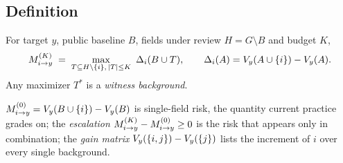 \begin{table}[!tbp]
\centering\small
\caption{Requirements for a field-level inference-risk quantity. \checkmark: satisfied;
$\circ$: partially; --: not satisfied.}\label{tab:req}
\end{table}

\subsection{Definition}
\begin{definition}\label{def:mk}
For target $y$, public baseline $B$, fields under review $H=G\setminus B$ and budget $K$,
\begin{equation}\label{eq:mk}
\Mik \;=\; \max_{T \subseteq H \setminus \{i\},\, |T| \le K}\ \Delta_i(B\cup T),\qquad
\Delta_i(A)=\Vy(A \cup \{i\}) - \Vy(A).
\end{equation}
Any maximizer $T^{*}$ is a \emph{witness background}.
\end{definition}
$M^{(0)}_{i\to y}=V_{y}(B\cup\{i\})-V_{y}(B)$ is single-field risk, the quantity current practice
grades on; the \emph{escalation} $M^{(K)}_{i \to y}-M^{(0)}_{i\to y}\ge 0$ is the risk that appears only in
combination; the \emph{gain matrix} $V_{y}(\{i,j\})-V_{y}(\{j\})$ lists the increment of $i$ over
every single background.

